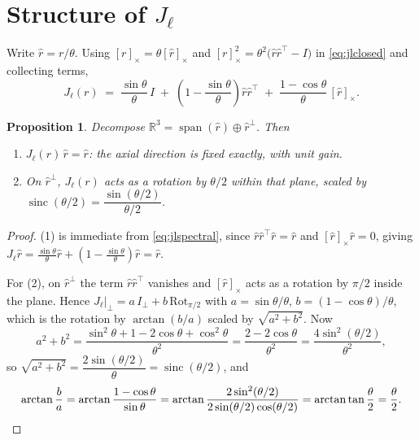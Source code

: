 \documentclass[11pt]{article}
\newtheorem{proposition}{Proposition}
\theoremstyle{definition}
\DeclareMathOperator{\sinc}{sinc}
\newcommand{\R}{\mathbb{R}}
\newcommand{\skewm}[1]{[#1]_{\times}}
\newcommand{\Jl}{J_{\ell}}
\begin{document}
\section{Structure of $\Jl$}

Write $\hat r = r/\theta$. Using $\skewm{r}=\theta\skewm{\hat r}$ and
$\skewm{r}^{2}=\theta^{2}\big(\hat r\hat r^{\top}-I\big)$ in \eqref{eq:jlclosed}
and collecting terms,
\begin{equation}\label{eq:jlspectral}
  \Jl(r) \;=\; \frac{\sin\theta}{\theta}\,I
         \;+\; \left(1-\frac{\sin\theta}{\theta}\right)\hat r\hat r^{\top}
         \;+\; \frac{1-\cos\theta}{\theta}\,\skewm{\hat r}.
\end{equation}

\begin{proposition}\label{prop:spectral}
Decompose $\R^{3}=\operatorname{span}(\hat r)\oplus \hat r^{\perp}$. Then
\begin{enumerate}
\item $\Jl(r)\,\hat r = \hat r$: the axial direction is fixed exactly, with unit gain.
\item On $\hat r^{\perp}$, $\Jl(r)$ acts as a rotation by $\theta/2$ within that
  plane, scaled by $\sinc(\theta/2) = \dfrac{\sin(\theta/2)}{\theta/2}$.
\end{enumerate}
\end{proposition}

\begin{proof}
(1) is immediate from \eqref{eq:jlspectral}, since $\hat r\hat r^\top \hat r=\hat r$
and $\skewm{\hat r}\hat r=0$, giving
$\Jl\hat r = \tfrac{\sin\theta}{\theta}\hat r + (1-\tfrac{\sin\theta}{\theta})\hat r = \hat r$.

For (2), on $\hat r^{\perp}$ the term $\hat r\hat r^{\top}$ vanishes and
$\skewm{\hat r}$ acts as a rotation by $\pi/2$ inside the plane. Hence
$\Jl|_{\perp} = a\,I_{\perp} + b\,\mathrm{Rot}_{\pi/2}$ with
$a=\sin\theta/\theta$, $b=(1-\cos\theta)/\theta$, which is the rotation by
$\arctan(b/a)$ scaled by $\sqrt{a^{2}+b^{2}}$. Now
\[
  a^{2}+b^{2}
  = \frac{\sin^{2}\theta + 1 - 2\cos\theta + \cos^{2}\theta}{\theta^{2}}
  = \frac{2-2\cos\theta}{\theta^{2}}
  = \frac{4\sin^{2}(\theta/2)}{\theta^{2}},
\]
so $\sqrt{a^2+b^2} = \dfrac{2\sin(\theta/2)}{\theta} = \sinc(\theta/2)$, and
\[
  \arctan\frac{b}{a}
  = \arctan\frac{1-\cos\theta}{\sin\theta}
  = \arctan\frac{2\sin^{2}(\theta/2)}{2\sin(\theta/2)\cos(\theta/2)}
  = \arctan\tan\frac{\theta}{2}
  = \frac{\theta}{2}. \qedhere
\]
\end{proof}
\end{document}

